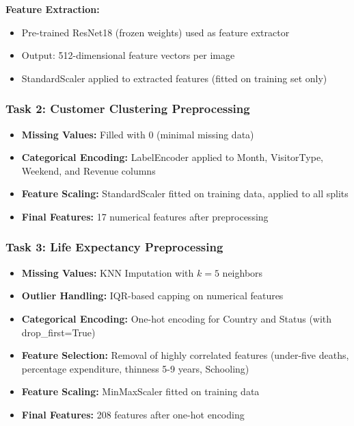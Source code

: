 \documentclass[11pt,a4paper]{article}
\begin{document}
\textbf{Feature Extraction:}
\begin{itemize}
    \item Pre-trained ResNet18 (frozen weights) used as feature extractor
    \item Output: 512-dimensional feature vectors per image
    \item StandardScaler applied to extracted features (fitted on training set only)
\end{itemize}

\subsubsection{Task 2: Customer Clustering Preprocessing}

\begin{itemize}
    \item \textbf{Missing Values:} Filled with 0 (minimal missing data)
    \item \textbf{Categorical Encoding:} LabelEncoder applied to Month, VisitorType, Weekend, and Revenue columns
    \item \textbf{Feature Scaling:} StandardScaler fitted on training data, applied to all splits
    \item \textbf{Final Features:} 17 numerical features after preprocessing
\end{itemize}

\subsubsection{Task 3: Life Expectancy Preprocessing}

\begin{itemize}
    \item \textbf{Missing Values:} KNN Imputation with $k = 5$ neighbors
    \item \textbf{Outlier Handling:} IQR-based capping on numerical features
    \item \textbf{Categorical Encoding:} One-hot encoding for Country and Status (with drop\_first=True)
    \item \textbf{Feature Selection:} Removal of highly correlated features (under-five deaths, percentage expenditure, thinness 5-9 years, Schooling)
    \item \textbf{Feature Scaling:} MinMaxScaler fitted on training data
    \item \textbf{Final Features:} 208 features after one-hot encoding
\end{itemize}
\end{document}
